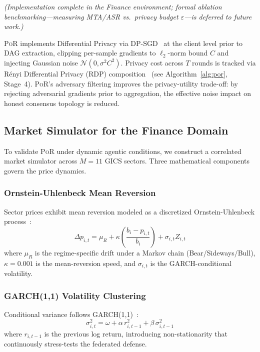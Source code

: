 \documentclass[journal]{IEEEtran}
\newcommand{\por}{\textsc{PoR}}
\begin{document}
\textit{(Implementation complete in the Finance environment; formal ablation
benchmarking---measuring MTA/ASR vs.\ privacy budget $\varepsilon$---is
deferred to future work.)}

\por{} implements Differential Privacy via DP-SGD~\cite{abadi2016deeplearningdp}
at the client level prior to DAG extraction, clipping per-sample gradients
to $\ell_2$-norm bound $C$ and injecting Gaussian noise $\mathcal{N}(0,\sigma^2C^2)$.
Privacy cost across $T$ rounds is tracked via R\'{e}nyi Differential Privacy
(RDP) composition~\cite{mironov2017rdp} (see Algorithm~\ref{alg:por}, Stage~4).
\por{}'s adversary filtering improves the privacy-utility trade-off: by
rejecting adversarial gradients prior to aggregation, the effective noise
impact on honest consensus topology is reduced.

\subsection{Market Simulator for the Finance Domain}
\label{sec:market_sim}

To validate \por{} under dynamic agentic conditions, we construct a correlated
market simulator across $M=11$ GICS sectors. Three mathematical components
govern the price dynamics.

\subsubsection{Ornstein-Uhlenbeck Mean Reversion}
Sector prices exhibit mean reversion modeled as a discretized
Ornstein-Uhlenbeck process~\cite{uhlenbeck1930brownian}:
\begin{equation}
  \Delta p_{i,t} = \mu_R + \kappa\!\left(\frac{b_i - p_{i,t}}{b_i}\right)
  + \sigma_{i,t} Z_{i,t}
  \label{eq:ou}
\end{equation}
where $\mu_R$ is the regime-specific drift under a Markov chain
(Bear/Sideways/Bull), $\kappa=0.001$ is the mean-reversion speed, and
$\sigma_{i,t}$ is the GARCH-conditional volatility.

\subsubsection{GARCH(1,1) Volatility Clustering}
Conditional variance follows GARCH(1,1)~\cite{bollerslev1986garch}:
\begin{equation}
  \sigma_{i,t}^2 = \omega + \alpha\, r_{i,t-1}^2 + \beta\,\sigma_{i,t-1}^2
  \label{eq:garch}
\end{equation}
where $r_{i,t-1}$ is the previous log return, introducing non-stationarity
that continuously stress-tests the federated defense.
\end{document}
